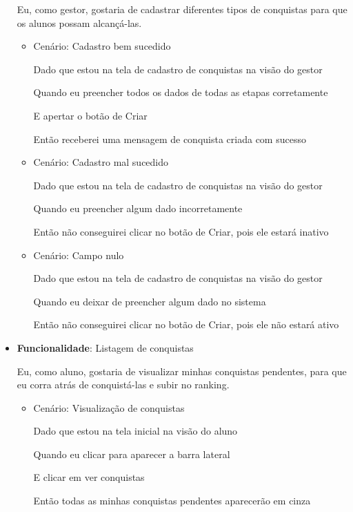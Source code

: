 \begin{itemize}
    Eu, como gestor, gostaria de cadastrar diferentes tipos de conquistas para que os alunos possam alcançá-las.
    \begin{itemize}
        \item Cenário: Cadastro bem sucedido  
        \par Dado que estou na tela de cadastro de conquistas na visão do gestor
        \par Quando eu preencher todos os dados de todas as etapas corretamente
        \par E apertar o botão de Criar
        \par Então receberei uma mensagem de conquista criada com sucesso
    \end{itemize}   
    \begin{itemize}
        \item Cenário: Cadastro mal sucedido  
        \par Dado que estou na tela de cadastro de conquistas na visão do gestor
        \par Quando eu preencher algum dado incorretamente
        \par Então não conseguirei clicar no botão de Criar, pois ele estará inativo
    \end{itemize}   
    \begin{itemize}
        \item Cenário: Campo nulo
        \par Dado que estou na tela de cadastro de conquistas na visão do gestor
        \par Quando eu deixar de preencher algum dado no sistema
        \par Então não conseguirei clicar no botão de Criar, pois ele não estará ativo
    \end{itemize}   

\item\textbf{Funcionalidade}: Listagem de conquistas
    
    Eu, como aluno, gostaria de visualizar minhas conquistas pendentes, para que eu corra atrás de conquistá-las e subir no \gls{ranking}.
    \begin{itemize}
        \item Cenário: Visualização de conquistas 
        \par Dado que estou na tela inicial na visão do aluno
        \par Quando eu clicar para aparecer a barra lateral
        \par E clicar em ver conquistas
        \par Então todas as minhas conquistas pendentes aparecerão em cinza
    \end{itemize}  


\end{itemize}
